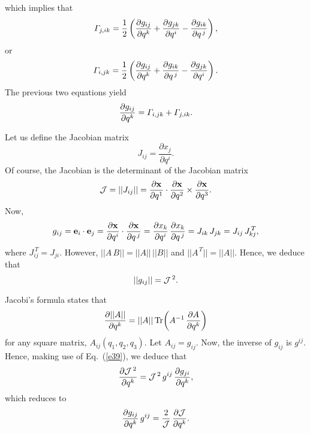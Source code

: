 \documentclass[12pt,prb,aps,notitlepage]{revtex4-1}
\begin{document}
which implies that
\begin{equation}
 {\mit\Gamma}_{j,ik}=\frac{1}{2}\left(\frac{\partial g_{ij}}{\partial q^k} + \frac{\partial g_{jk}}{\partial q^i} -\frac{\partial g_{ik}}{\partial q^{\,j}}\right),
 \end{equation}
 or 
 \begin{equation}
 {\mit\Gamma}_{i,jk}=\frac{1}{2}\left(\frac{\partial g_{ij}}{\partial q^k} + \frac{\partial g_{ik}}{\partial q^{\,j}} -\frac{\partial g_{jk}}{\partial q^{i}}\right).
 \end{equation}
 The previous two equations yield
 \begin{equation}\label{e35}
 \frac{\partial g_{ij}}{\partial q^k} = {\mit\Gamma}_{i,jk} + {\mit\Gamma}_{j,ik}.
 \end{equation}
 
 Let us define the Jacobian matrix
 \begin{equation}
 J_{ij} = \frac{\partial x_j}{\partial q^i}.
 \end{equation}
 Of course, the Jacobian is the determinant of the Jacobian matrix
 \begin{equation}
 {\cal J} = ||J_{ij}||= \frac{\partial{\bf x}}{\partial q^1}\cdot\frac{\partial {\bf x}}{\partial q^2}\times\frac{\partial{\bf x}}{\partial q^3}.
 \end{equation}
 Now,
 \begin{equation}
 g_{ij} = {\bf e}_i\cdot{\bf e}_j= \frac{\partial{\bf x}}{\partial q^i}\cdot\frac{{\partial {\bf x}}}{\partial q^{\,j}}= \frac{\partial x_k}{\partial q^i}\,\frac{{\partial x_k}}{\partial q^{\,j}}= J_{ik}\,J_{jk} = J_{ij}\,J^{\,T}_{kj},
 \end{equation}
 where $J^{\,T}_{ij}= J_{ji}$. However, $||A\,B|| = ||A||\,||B||$ and $||A^{\,T}|| = ||A||$. Hence, we deduce that
 \begin{equation}\label{e39}
 ||g_{ij}|| = {\cal J}^{\,2}.
 \end{equation}
 
 Jacobi's formula states that
 \begin{equation}
 \frac{\partial ||A||}{\partial q^k} = ||A||\,{\rm Tr}\!\left(A^{-1}\,\frac{\partial A}{\partial q^k}\right)
 \end{equation}
 for any square matrix, $A_{ij}(q_1,q_2,q_3)$. 
 Let $A_{ij}= g_{ij}$. Now, the inverse of $g_{ij}$ is $g^{ij}$. Hence, making use of Eq.~(\ref{e39}), we deduce that
 \begin{equation}
 \frac{\partial{\cal J}^{\,2}}{\partial q^k} = {\cal J}^{\,2}\,g^{ij}\,\frac{\partial g_{ji}}{\partial q^k},
 \end{equation}
 which reduces to
 \begin{equation}\label{e42}
 \frac{\partial g_{ij}}{\partial q^k}\,g^{ij} = \frac{2}{\cal J}\,\frac{\partial{\cal J}}{\partial q^k}.
 \end{equation}
 
\end{document}
